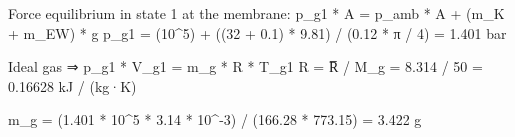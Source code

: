 Force equilibrium in state 1 at the membrane:  
p_g1 * A = p_amb * A + (m_K + m_EW) * g  
p_g1 = (10^5) + ((32 + 0.1) * 9.81) / (0.12 * π / 4)  
= 1.401 bar  

Ideal gas ⇒ p_g1 * V_g1 = m_g * R * T_g1  
R = R̅ / M_g = 8.314 / 50 = 0.16628 kJ / (kg·K)  

m_g = (1.401 * 10^5 * 3.14 * 10^-3) / (166.28 * 773.15)  
= 3.422 g